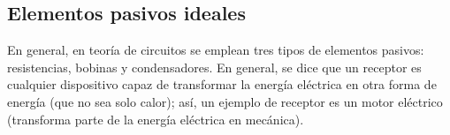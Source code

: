 \documentclass[11pt]{book} %
\begin{document}
	
	
	
	
	
	
	\subsection{Elementos pasivos ideales}
	
	En general, en teoría de circuitos se emplean tres tipos de elementos pasivos: resistencias, bobinas y condensadores. En general, se dice que un receptor es cualquier dispositivo capaz de transformar la energía eléctrica en otra forma de energía (que no sea solo calor); así, un ejemplo de receptor es un motor eléctrico (transforma parte de la energía eléctrica en mecánica).  
	
\end{document}
